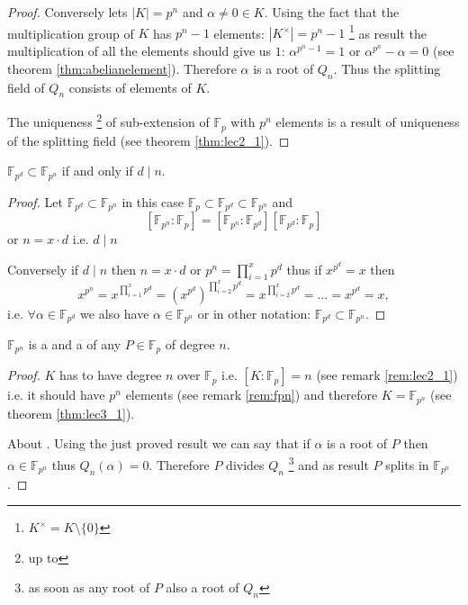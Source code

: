 \begin{theorem}
\begin{proof}
    Conversely lets $\left|K\right| = p^n$ and
    $\alpha \ne 0 \in K$.
    Using the fact that the multiplication group of $K$ has $p^n - 1$
    elements: $\left|K^\times\right| = p^n - 1$
    \footnote{
      $K^\times = K \setminus \{0\}$
    }
    as result the multiplication of all the elements should give us
    $1$: $\alpha^{p^n-1} = 1$ or $\alpha^{p^n} - \alpha = 0$
    (see theorem \ref{thm:abelianelement}).
    Therefore $\alpha$ is a root of $Q_n$. Thus the splitting field of
    $Q_n$ consists of elements of $K$.

    The uniqueness
    \footnote{
      up to 
    }
    of sub-extension of
    $\mathbb{F}_p$ with $p^n$ elements is a result of uniqueness of
    the splitting field (see theorem \ref{thm:lec2_1}). 
  \end{proof}
  \label{thm:lec3_1}
\end{theorem}

\begin{theorem}
  $\mathbb{F}_{p^d} \subset \mathbb{F}_{p^n}$ if and only if $d \mid n$. 
  \begin{proof}
    Let $\mathbb{F}_{p^d} \subset \mathbb{F}_{p^n}$ in this case
    $\mathbb{F}_p \subset \mathbb{F}_{p^d} \subset \mathbb{F}_{p^n}$
    and
    \[
    \left[\mathbb{F}_{p^n}:\mathbb{F}_{p}\right] =
    \left[\mathbb{F}_{p^n}:\mathbb{F}_{p^d}\right]
    \left[\mathbb{F}_{p^d}:\mathbb{F}_{p}\right]
    \]
    or $n = x \cdot d$ i.e. $d \mid n$

    Conversely if $d \mid n$ then $n = x \cdot d$ or
    $p^n = \prod^x_{i=1} p^d$ thus if $x^{p^d} = x$ then
    \[
    x^{p^n} = x^{\prod^x_{i=1} p^d} =
    \left(x^{p^d}\right)^{\prod^x_{i=2} p^d} = x^{\prod^x_{i=2} p^d} =
    \dots = x^{p^d} = x,
    \]
    i.e. $\forall \alpha \in \mathbb{F}_{p^d}$ we also have
    $\alpha \in \mathbb{F}_{p^n}$ or in other notation:
    $\mathbb{F}_{p^d} \subset \mathbb{F}_{p^n}$.
  \end{proof}
  \label{thm:lec3_1_2}
\end{theorem}

\begin{theorem}
  $\mathbb{F}_{p^n}$ is a  and a
   of any 
  $P \in \mathbb{F}_p$ of degree $n$.
  \begin{proof}
     $K$ has to have degree $n$ over
    $\mathbb{F}_p$ i.e.
    $\left[K:\mathbb{F}_p\right] = n$ (see remark \ref{rem:lec2_1})
    i.e. it should have $p^n$
    elements (see remark \ref{rem:fpn})
    and therefore $K=\mathbb{F}_{p^n}$
    (see theorem \ref{thm:lec3_1}).

    About . Using the just proved result
    we can say that if $\alpha$ is a root of $P$
    then $\alpha \in \mathbb{F}_{p^n}$ thus
    $Q_n\left(\alpha\right) = 0$. Therefore $P$ divides $Q_n$ 
    \footnote{as soon as any root of $P$ also a root of $Q_n$} and as
    result $P$ splits in $\mathbb{F}_{p^n}$.
  \end{proof}
  \label{thm:lec3_1_3}
\end{theorem}

